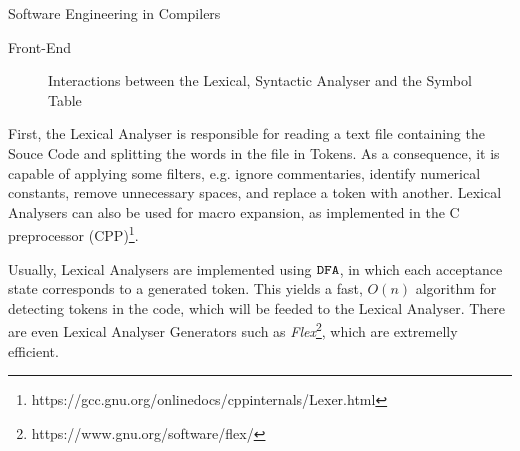 \begin{section}{Software Engineering in Compilers}
\begin{subsection}{Front-End}
\begin{figure}
\begin{center}
{
}
\end{center}

\caption{Interactions between the Lexical, Syntactic Analyser and the Symbol Table}
\label{fig:lexico_sintatico}
\end{figure}


First, the Lexical Analyser is responsible for reading a text file containing
the Souce Code and splitting the words in the file in Tokens. As a consequence,
it is capable of applying some filters, e.g. ignore commentaries, identify
numerical constants, remove unnecessary spaces, and replace a token with
another.  Lexical Analysers can also be used for macro expansion, as
implemented in the C preprocessor
(CPP)\footnote{https://gcc.gnu.org/onlinedocs/cppinternals/Lexer.html}.


Usually, Lexical Analysers are implemented using $\texttt{DFA}$, in which each
acceptance state corresponds to a generated token. This yields a fast,
$O(n)$ algorithm for detecting tokens in the code, which will be feeded
to the Lexical Analyser. There are even Lexical Analyser Generators such
as \textit{Flex}\footnote{https://www.gnu.org/software/flex/}, which
are extremelly efficient.


\end{subsection}
\end{section}
